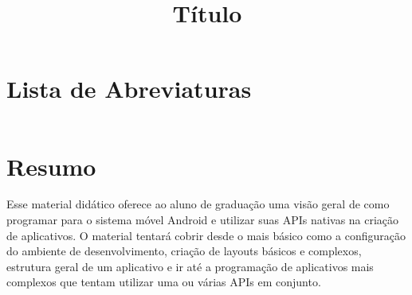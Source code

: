 \documentclass[a4paper,12pt,brazil,doubleside]{book}
\title{Título}
\begin{document}


\pagestyle{empty}

\cleardoublepage

\onehalfspace

\pagestyle{plain}

\setcounter{tocdepth}{1} %
\tableofcontents
\clearpage %
\thispagestyle{empty}

\listoffigures
{}
\clearpage %
\thispagestyle{empty}

\listoftables
{}
\clearpage %
\thispagestyle{empty}

\lstlistoflistings
{}
\clearpage %
\thispagestyle{empty}

\chapter*{Lista de Abreviaturas}
\begin{longtable}{ll}
\end{longtable}

\renewcommand\lstlistingname{Algorithm}
\renewcommand\lstlistlistingname{Algorithms}

\chapter*{Resumo}

\begin{singlespace}
Esse material didático oferece ao aluno de graduação uma visão geral de como programar para o sistema móvel Android e utilizar suas APIs nativas na criação de aplicativos. O material tentará cobrir desde o mais básico como a configuração do ambiente de desenvolvimento, criação de layouts básicos e complexos, estrutura geral de um aplicativo e ir até a programação de aplicativos mais complexos que tentam utilizar uma ou várias APIs em conjunto.
\end{singlespace}

\clearpage %
\thispagestyle{empty}

\thispagestyle{empty}
\end{document}
